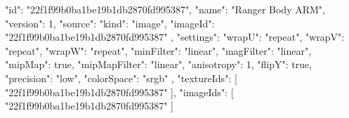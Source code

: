 {
  "id": "22f1f99b0ba1be19b1db2870fd995387",
  "name": "Ranger Body ARM",
  "version": 1,
  "source": {
    "kind": "image",
    "imageId": "22f1f99b0ba1be19b1db2870fd995387"
  },
  "settings": {
    "wrapU": "repeat",
    "wrapV": "repeat",
    "wrapW": "repeat",
    "minFilter": "linear",
    "magFilter": "linear",
    "mipMap": true,
    "mipMapFilter": "linear",
    "anisotropy": 1,
    "flipY": true,
    "precision": "low",
    "colorSpace": "srgb"
  },
  "textureIds": [
    "22f1f99b0ba1be19b1db2870fd995387"
  ],
  "imageIds": [
    "22f1f99b0ba1be19b1db2870fd995387"
  ]
}
